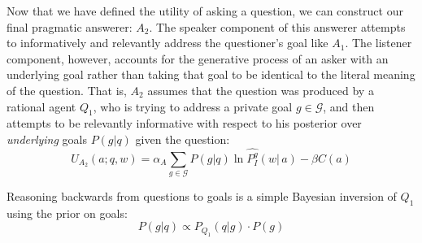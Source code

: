 \documentclass[11pt, floatsintext]{apa6}
\begin{document}

Now that we have defined the utility of asking a question, we can construct our final pragmatic answerer: $A_2$. The speaker component of this answerer attempts to informatively and relevantly address the questioner's goal like $A_1$. The listener component, however, accounts for the generative process of an asker with an underlying goal rather than taking that goal to be identical to the literal meaning of the question. That is, $A_2$ assumes that the question was produced by a rational agent $Q_1$, who is trying to address a private goal $g \in \mathcal{G}$, and then attempts to be relevantly informative with respect to his posterior over \emph{underlying} goals $P(g|q)$ given the question:
\begin{equation}
U_{A_2}(a; q, w) = \alpha_A \sum_{g \in \mathcal{G}} P(g|q) \ln \widehat{P^g_I}(w|\,a) - \beta C(a)
\end{equation}

%
Reasoning backwards from questions to goals is a simple Bayesian inversion of $Q_1$ using the prior on goals:
$$
P(g|q) \propto P_{Q_1}(q|g)\cdot P(g)
$$
\end{document}
